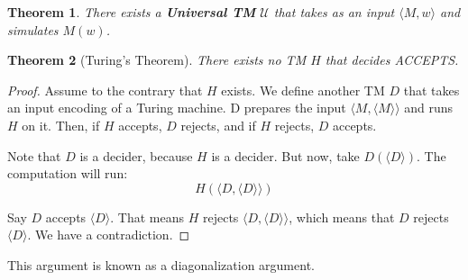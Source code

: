 \documentclass[11pt]{article}
\theoremstyle{plain}
\newtheorem{thm}{Theorem}
\theoremstyle{definition}
\begin{document}
\begin{thm}
    There exists a {\bf Universal TM} $\mathcal{U}$ that takes as an input $\langle M, w \rangle$ and simulates $M(w)$.
\end{thm}

\begin{thm}[Turing's Theorem]
    There exists no TM $H$ that decides ACCEPTS.
\end{thm}
\begin{proof}
    Assume to the contrary that $H$ exists. We define another TM $D$ that takes an input encoding of a Turing machine. 
    D prepares the input $\langle M, \langle M \rangle \rangle$ and runs $H$ on it. Then, if $H$ accepts, $D$ rejects, and 
    if $H$ rejects, $D$ accepts.

    Note that $D$ is a decider, because $H$ is a decider. But now, take $D(\langle D \rangle)$. The computation will run:
    $$H(\langle D, \langle D \rangle \rangle)$$

    Say $D$ accepts $\langle D \rangle$. That means $H$ rejects $\langle D, \langle D \rangle \rangle$, which means that 
    $D$ rejects $\langle D \rangle$. We have a contradiction.
\end{proof}

This argument is known as a diagonalization argument.
\end{document}

